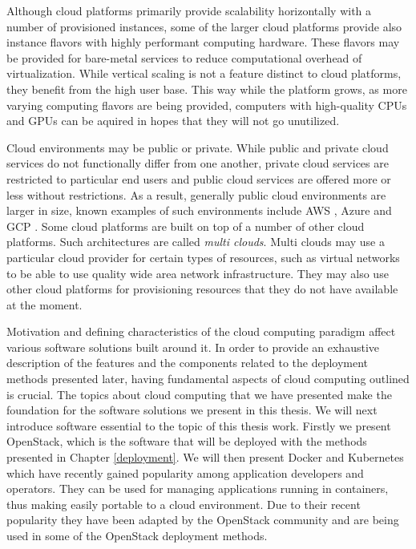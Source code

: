Although cloud platforms primarily provide scalability horizontally with a
number of provisioned instances, some of the larger cloud platforms provide
also instance flavors with highly performant computing hardware. These flavors
may be provided for bare-metal services to reduce computational overhead of
virtualization. While vertical scaling is not a feature distinct to cloud
platforms, they benefit from the high user base. This way while the platform
grows, as more varying computing flavors are being provided, computers with
high-quality CPUs and GPUs can be aquired in hopes that they will not go
unutilized.

Cloud environments may be public or private. While public and private cloud
services do not functionally differ from one another, private cloud services
are restricted to particular end users and public cloud services are offered
more or less without restrictions. As a result, generally public cloud
environments are larger in size, known examples of such environments include
AWS \cite{aws}, Azure \cite{azure} and GCP \cite{gcp}. Some cloud platforms are
built on top of a number of other cloud platforms. Such architectures are
called \textit{multi clouds}. Multi clouds may use a particular cloud provider
for certain types of resources, such as virtual networks to be able to use
quality wide area network infrastructure. They may also use other cloud
platforms for provisioning resources that they do not have available at the
moment.

Motivation and defining characteristics of the cloud computing paradigm affect
various software solutions built around it. In order to provide an exhaustive
description of the features and the components related to the deployment
methods presented later, having fundamental aspects of cloud computing outlined
is crucial. The topics about cloud computing that we have presented make the
foundation for the software solutions we present in this thesis. We will next
introduce software essential to the topic of this thesis work. Firstly we
present OpenStack, which is the software that will be deployed with the methods
presented in Chapter \ref{deployment}. We will then present Docker and
Kubernetes which have recently gained popularity among application developers
and operators. They can be used for managing applications running in
containers, thus making easily portable to a cloud environment. Due to their
recent popularity they have been adapted by the OpenStack community and are
being used in some of the OpenStack deployment methods.

